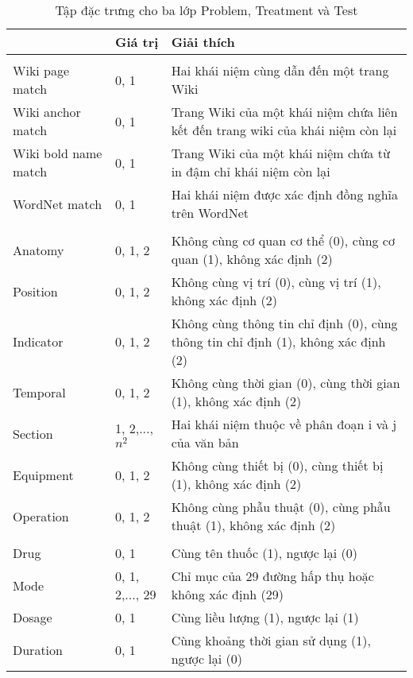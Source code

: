 \begin{table}[th]
\centering
\caption{Tập đặc trưng cho ba lớp Problem, Treatment và Test \label{tab:ProbTreatTestFeatures}}
\footnotesize\sffamily

\begin{tabularx}{\textwidth}{@{}>{\hspace{1em}}P{\raggedright}{0.3}lL@{}}
\toprule 
{} & \textbf{Giá trị} & \textbf{Giải thích}\\
\midrule
{}\\
Wiki page match & 0, 1 & Hai khái niệm cùng dẫn đến một trang Wiki\\
Wiki anchor match & 0, 1 & Trang Wiki của một khái niệm chứa liên kết đến trang wiki của khái niệm còn lại\\
Wiki bold name match & 0, 1 & Trang Wiki của một khái niệm chứa từ in đậm chỉ khái niệm còn lại\\
WordNet match & 0, 1 & Hai khái niệm được xác định đồng nghĩa trên WordNet\\
\\
Anatomy & 0, 1, 2 & Không cùng cơ quan cơ thể (0), cùng cơ quan (1), không xác định (2)\\
Position & 0, 1, 2 & Không cùng vị trí (0), cùng vị trí (1), không xác định (2)\\
Indicator & 0, 1, 2 & Không cùng thông tin chỉ định (0), cùng thông tin chỉ định (1), không xác định (2)\\
Temporal & 0, 1, 2 & Không cùng thời gian (0), cùng thời gian (1), không xác định (2)\\
Section & 1, 2,..., $n^{2}$ & Hai khái niệm thuộc về phân đoạn i và j của văn bản\\
Equipment & 0, 1, 2 & Không cùng thiết bị (0), cùng thiết bị (1), không xác định (2)\\
Operation & 0, 1, 2 & Không cùng phẫu thuật (0), cùng phẫu thuật (1), không xác định (2)\\
\\
Drug & 0, 1 & Cùng tên thuốc (1), ngược lại (0)\\
Mode & 0, 1, 2,..., 29 & Chỉ mục của 29 đường hấp thụ hoặc không xác định (29)\\
Dosage & 0, 1 & Cùng liều lượng (1), ngược lại (1)\\
Duration & 0, 1 & Cùng khoảng thời gian sử dụng (1), ngược lại (0)\\

\end{tabularx}
\end{table}
